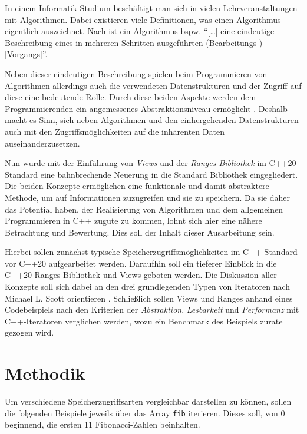 \documentclass[runningheads]{llncs}
\begin{document}
In einem Informatik-Studium beschäftigt man sich in vielen Lehrveranstaltungen mit Algorithmen.
Dabei existieren viele Definitionen, was einen Algorithmus eigentlich auszeichnet.
Nach \cite[S.4]{aud} ist ein Algorithmus bspw. \enquote{[\dots] eine eindeutige Beschreibung eines in mehreren Schritten ausgeführten \mbox{(Bearbeitungs-)} [Vorgangs]}.

Neben dieser eindeutigen Beschreibung spielen beim Programmieren von Algorithmen allerdings auch die verwendeten Datenstrukturen und der Zugriff auf diese eine bedeutende Rolle.
Durch diese beiden Aspekte werden dem Programmierenden ein angemessenes Abstraktionsniveau ermöglicht \cite{aud}.
Deshalb macht es Sinn, sich neben Algorithmen und den einhergehenden Datenstrukturen auch mit den Zugriffsmöglichkeiten auf die inhärenten Daten auseinanderzusetzen.

Nun wurde mit der Einführung von \textit{Views} und der \textit{Ranges-Bibliothek} im C++20-Standard eine bahnbrechende Neuerung in die Standard Bibliothek eingegliedert.
Die beiden Konzepte ermöglichen eine funktionale und damit abstraktere Methode, um auf Informationen zuzugreifen und sie zu speichern.
Da sie daher das Potential haben, der Realisierung von Algorithmen und dem allgemeinen Programmieren in C++ zugute zu kommen, lohnt sich hier eine nähere Betrachtung und Bewertung.
Dies soll der Inhalt dieser Ausarbeitung sein.

Hierbei sollen zunächst typische Speicherzugriffsmöglichkeiten im C++-Standard vor C++20 aufgearbeitet werden.
Daraufhin soll ein tieferer Einblick in die C++20 Ranges-Bibliothek und Views geboten werden.
Die Diskussion aller Konzepte soll sich dabei an den drei grundlegenden Typen von Iteratoren nach Michael L. Scott orientieren \cite{plp}.
Schließlich sollen Views und Ranges anhand eines Codebeispiels nach den Kriterien der \textit{Abstraktion}, \textit{Lesbarkeit} und \textit{Performanz} mit C++-Iteratoren verglichen werden, wozu ein Benchmark des Beispiels zurate gezogen wird.

\section{Methodik}

Um verschiedene Speicherzugriffsarten vergleichbar darstellen zu können, sollen die folgenden Beispiele jeweils über das Array \texttt{fib} iterieren.
Dieses soll, von 0 beginnend, die ersten 11 Fibonacci-Zahlen beinhalten.

\end{document}
